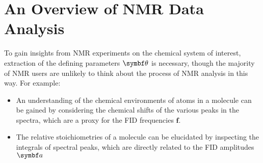 \section{An Overview of NMR Data Analysis}
To gain insights from \ac{NMR} experiments on the chemical system of interest,
extraction of the defining parameters $\bth$ is necessary, though the majority
of \ac{NMR} users are unlikely to think about the process of \ac{NMR} analysis
in this way. For example:
\begin{itemize}
    \item An understanding of the chemical environments of atoms in a molecule
        can be gained by considering the chemical shifts of the various peaks
        in the spectra, which are a proxy for the \ac{FID} frequencies
        $\symbf{f}$.
    \item  The relative stoichiometries of a
        molecule can be elucidated by inspecting the integrals of spectral
        peaks, which are directly related to the \ac{FID} amplitudes $\bda$
\end{itemize}


